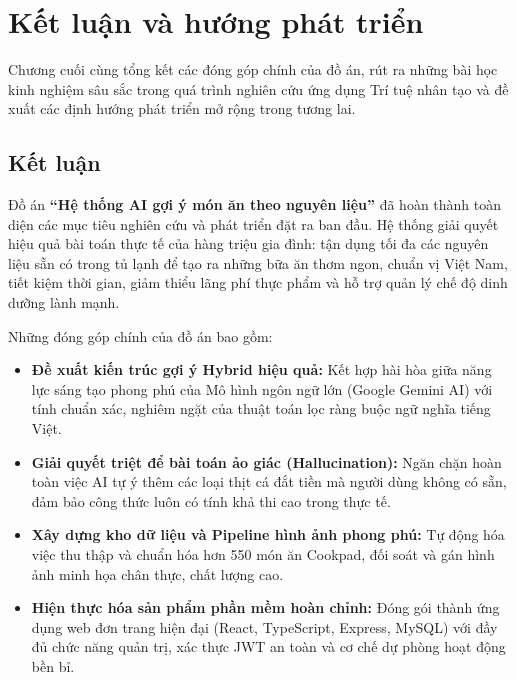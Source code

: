\chapter{Kết luận và hướng phát triển}
\label{ch:ketluan}

\begin{muctieu}
Chương cuối cùng tổng kết các đóng góp chính của đồ án, rút ra những bài học kinh nghiệm sâu sắc trong quá trình nghiên cứu ứng dụng Trí tuệ nhân tạo và đề xuất các định hướng phát triển mở rộng trong tương lai.
\end{muctieu}

\section{Kết luận}

Đồ án \textbf{``Hệ thống AI gợi ý món ăn theo nguyên liệu''} đã hoàn thành toàn diện các mục tiêu nghiên cứu và phát triển đặt ra ban đầu. Hệ thống giải quyết hiệu quả bài toán thực tế của hàng triệu gia đình: tận dụng tối đa các nguyên liệu sẵn có trong tủ lạnh để tạo ra những bữa ăn thơm ngon, chuẩn vị Việt Nam, tiết kiệm thời gian, giảm thiểu lãng phí thực phẩm và hỗ trợ quản lý chế độ dinh dưỡng lành mạnh.

Những đóng góp chính của đồ án bao gồm:
\begin{itemize}[leftmargin=1.6em, itemsep=2pt]
  \item \textbf{Đề xuất kiến trúc gợi ý Hybrid hiệu quả:} Kết hợp hài hòa giữa năng lực sáng tạo phong phú của Mô hình ngôn ngữ lớn (Google Gemini AI) với tính chuẩn xác, nghiêm ngặt của thuật toán lọc ràng buộc ngữ nghĩa tiếng Việt.
  \item \textbf{Giải quyết triệt để bài toán ảo giác (Hallucination):} Ngăn chặn hoàn toàn việc AI tự ý thêm các loại thịt cá đắt tiền mà người dùng không có sẵn, đảm bảo công thức luôn có tính khả thi cao trong thực tế.
  \item \textbf{Xây dựng kho dữ liệu và Pipeline hình ảnh phong phú:} Tự động hóa việc thu thập và chuẩn hóa hơn 550 món ăn Cookpad, đối soát và gán hình ảnh minh họa chân thực, chất lượng cao.
  \item \textbf{Hiện thực hóa sản phẩm phần mềm hoàn chỉnh:} Đóng gói thành ứng dụng web đơn trang hiện đại (React, TypeScript, Express, MySQL) với đầy đủ chức năng quản trị, xác thực JWT an toàn và cơ chế dự phòng hoạt động bền bỉ.
\end{itemize}

